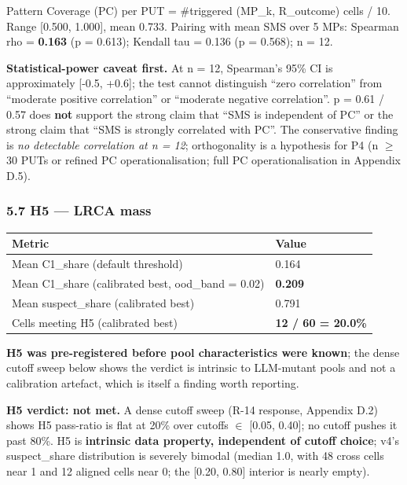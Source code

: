 \documentclass[review,12pt,authoryear]{elsarticle}
\newcounter{none}                   %
\begin{document}
Pattern Coverage (PC) per PUT = \#triggered (MP\_k, R\_outcome) cells /
10. Range {[}0.500, 1.000{]}, mean 0.733. Pairing with mean SMS over 5
MPs: Spearman rho = \textbf{0.163} (p = 0.613); Kendall tau = 0.136 (p =
0.568); n = 12.

\textbf{Statistical-power caveat first.} At n = 12, Spearman's 95\% CI
is approximately {[}-0.5, +0.6{]}; the test cannot distinguish ``zero
correlation'' from ``moderate positive correlation'' or ``moderate
negative correlation''. p = 0.61 / 0.57 does \textbf{not} support the
strong claim that ``SMS is independent of PC'' or the strong claim that
``SMS is strongly correlated with PC''. The conservative finding is
\emph{no detectable correlation at n = 12}; orthogonality is a
hypothesis for P4 (n $\geq$ 30 PUTs or refined PC operationalisation; full PC
operationalisation in Appendix D.5).

\subsubsection{5.7 H5 --- LRCA mass}\label{h5-lrca-mass}

{\def\LTcaptype{none} %
\begin{longtable}[]{@{}ll@{}}
\toprule\noalign{}
Metric & Value \\
\midrule\noalign{}
\endhead
\bottomrule\noalign{}
\endlastfoot
Mean C1\_share (default threshold) & 0.164 \\
Mean C1\_share (calibrated best, ood\_band = 0.02) & \textbf{0.209} \\
Mean suspect\_share (calibrated best) & 0.791 \\
Cells meeting H5 (calibrated best) & \textbf{12 / 60 = 20.0\%} \\
\end{longtable}
}

\textbf{H5 was pre-registered before pool characteristics were known};
the dense cutoff sweep below shows the verdict is intrinsic to
LLM-mutant pools and not a calibration artefact, which is itself a
finding worth reporting.

\textbf{H5 verdict: not met.} A dense cutoff sweep (R-14 response,
Appendix D.2) shows H5 pass-ratio is flat at 20\% over cutoffs $\in$
{[}0.05, 0.40{]}; no cutoff pushes it past 80\%. H5 is \textbf{intrinsic
data property, independent of cutoff choice}; v4's suspect\_share
distribution is severely bimodal (median 1.0, with 48 cross cells near 1
and 12 aligned cells near 0; the {[}0.20, 0.80{]} interior is nearly
empty).
\end{document}
